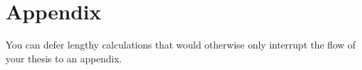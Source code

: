\chapter{Appendix}

You can defer lengthy calculations that would otherwise only interrupt
the flow of your thesis to an appendix.
